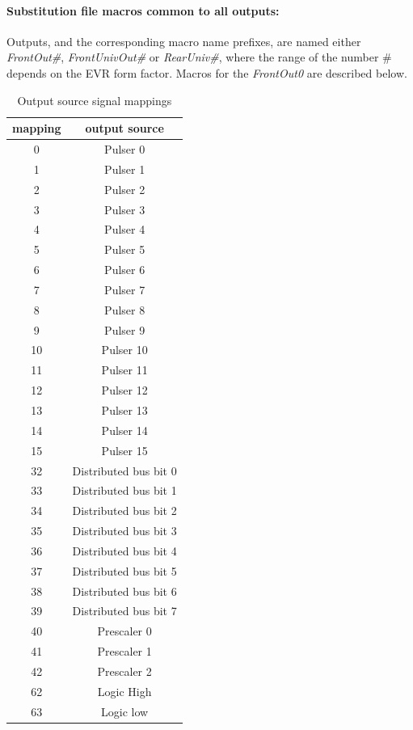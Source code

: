 \documentclass[12pt,a4paper]{article}
\begin{document}
\paragraph{Substitution file macros common to all outputs:} Outputs, and the corresponding macro name prefixes, are named either \emph{FrontOut\#},\emph{ FrontUnivOut\#} or \emph{RearUniv\#}, where the range of the number \# depends on the EVR form factor. Macros for the \emph{FrontOut0} are described below. 

\begin{table}[!hbt]
\caption{Output source signal mappings}
\label{tab:mappings}
\centering
	\begin{tabular}{|c|c|}
		\hline \textbf{mapping} & \textbf{output source} \\ \hline 
		\hline 0 & Pulser 0 \\ 
		\hline 1 & Pulser 1 \\ 
		\hline 2 & Pulser 2 \\ 
		\hline 3 & Pulser 3 \\ 
		\hline 4 & Pulser 4 \\ 
		\hline 5 & Pulser 5 \\ 
		\hline 6 & Pulser 6 \\ 
		\hline 7 & Pulser 7 \\ 
		\hline 8 & Pulser 8 \\ 
		\hline 9 & Pulser 9 \\ 
		\hline 10 & Pulser 10 \\ 
		\hline 11 & Pulser 11 \\ 
		\hline 12 & Pulser 12 \\ 
		\hline 13 & Pulser 13 \\ 
		\hline 14 & Pulser 14 \\ 
		\hline 15 & Pulser 15 \\ 
		\hline 32 & Distributed bus bit 0 \\ 
		\hline 33 & Distributed bus bit 1 \\ 
		\hline 34 & Distributed bus bit 2 \\ 
		\hline 35 & Distributed bus bit 3 \\ 
		\hline 36 & Distributed bus bit 4 \\ 
		\hline 37 & Distributed bus bit 5 \\ 
		\hline 38 & Distributed bus bit 6 \\ 
		\hline 39 & Distributed bus bit 7 \\ 
		\hline 40 & Prescaler 0 \\ 
		\hline 41 & Prescaler 1 \\ 
		\hline 42 & Prescaler 2 \\ 
		\hline 62 & Logic High \\ 
		\hline 63 & Logic low \\ 
		\hline 
	\end{tabular} 
\end{table}
\end{document}
